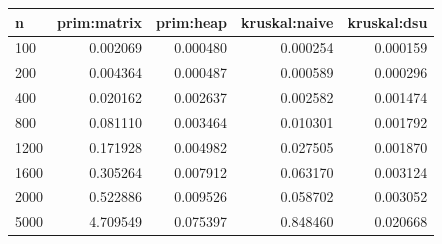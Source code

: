 \begin{tabular}{lrrrr}
\hline
n & prim:matrix & prim:heap & kruskal:naive & kruskal:dsu \\
\hline
100 & 0.002069 & 0.000480 & 0.000254 & 0.000159 \\
200 & 0.004364 & 0.000487 & 0.000589 & 0.000296 \\
400 & 0.020162 & 0.002637 & 0.002582 & 0.001474 \\
800 & 0.081110 & 0.003464 & 0.010301 & 0.001792 \\
1200 & 0.171928 & 0.004982 & 0.027505 & 0.001870 \\
1600 & 0.305264 & 0.007912 & 0.063170 & 0.003124 \\
2000 & 0.522886 & 0.009526 & 0.058702 & 0.003052 \\
5000 & 4.709549 & 0.075397 & 0.848460 & 0.020668 \\
\hline
\end{tabular}

